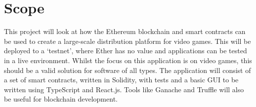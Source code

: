 \section{Scope}

This project will look at how the Ethereum blockchain and smart contracts can be used to create a large-scale distribution platform for video games. This will be deployed to a `testnet', where Ether has no value and applications can be tested in a live environment. Whilst the focus on this application is on video games, this should be a valid solution for software of all types.
\x
The application will consist of a set of smart contracts, written in Solidity, with tests and a basic GUI to be written using TypeScript and React.js. Tools like Ganache and Truffle will also be useful for blockchain development.  